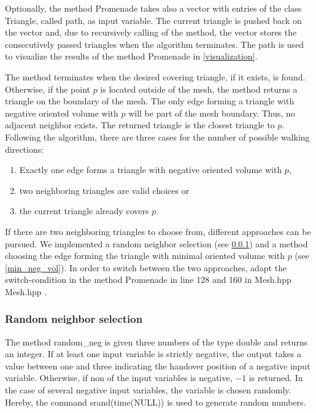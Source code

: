 \documentclass[10pt]{article}
\begin{document}
Optionally, the method {\ttfamily Promenade} takes also a vector with entries of the class {\ttfamily Triangle}, called {\ttfamily path}, as input variable. The current triangle is pushed back on the vector and, due to recursively calling of the method, the vector stores the consecutively passed triangles when the algorithm terminates. The path is used to visualize the results of the method {\ttfamily Promenade} in \ref{visualization}.

The method terminates when the desired covering triangle, if it exists, is found. Otherwise, if the point $p$ is located outside of the mesh, the method returns a triangle on the boundary of the mesh. The only edge forming a triangle with negative oriented volume with $p$ will be part of the mesh boundary. Thus, no adjacent neighbor exists. The returned triangle is the closest triangle to $p$.\\

Following the algorithm, there are three cases for the number of possible walking directions:
\begin{enumerate}
	\item Exactly one edge forms a triangle with negative oriented volume with $p$,
	\item two neighboring triangles are valid choices or
	\item the current triangle already covers $p$.
\end{enumerate}
If there are two neighboring triangles to choose from, different approaches can be pursued. We implemented a random neighbor selection (see \ref{ran_neighb_sel}) and a method choosing the edge forming the triangle with minimal oriented volume with $p$ (see \ref{min_neg_vol}). In order to switch between the two approaches, adapt the switch-condition in the method {\ttfamily Promenade} in line 128 and 160 in Mesh.hpp {\ttfamily Mesh.hpp }.

\subsubsection{Random neighbor selection} \label{ran_neighb_sel}

The method {\ttfamily random\_neg} is given three numbers of the type {\ttfamily double} and returns an integer. If at least one input variable is strictly negative, the output takes a value between one and three indicating the handover position of a negative input variable. Otherwise, if non of the input variables is negative, $-1$ is returned. In the case of several negative input variables, the variable is chosen randomly. Hereby, the command {\ttfamily srand(time(NULL))} is used to generate random numbers.
\end{document}
